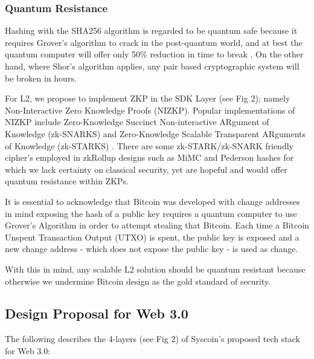 \documentclass[peerreview]{ieeesyscoin}
\begin{document}
\subsubsection{Quantum Resistance}

Hashing with the SHA256 algorithm is regarded to be quantum safe because it requires Grover's algorithm to crack in the post-quantum world, and at best the quantum computer will offer only 50\% reduction in time to break \cite{Nai19}. On the other hand, where Shor’s algorithm applies, any pair based cryptographic system will be broken in hours.

For L2, we propose to implement ZKP in the SDK Layer (see Fig 2); namely Non-Interactive Zero Knowledge Proofs (NIZKP). Popular implementations of NIZKP include Zero-Knowledge Succinct Non-interactive ARgument of Knowledge (zk-SNARKS) and Zero-Knowledge Scalable Transparent ARguments of Knowledge (zk-STARKS) \cite{Nas19}. There are some zk-STARK/zk-SNARK friendly cipher’s employed in zkRollup designs such as MiMC and Pederson hashes for which we lack certainty on classical security, yet are hopeful and would offer quantum resistance within ZKPs.

It is essential to acknowledge that Bitcoin was developed with change addresses in mind exposing the hash of a public key requires a quantum computer to use Grover’s Algorithm in order to attempt stealing that Bitcoin. Each time a Bitcoin Unspent Transaction Output (UTXO) is spent, the public key is exposed and a new change address - which does not expose the public key - is used as change.

With this in mind, any scalable L2 solution should be quantum resistant because otherwise we undermine Bitcoin design as the gold standard of security.


\subsection{Design Proposal for Web 3.0}

The following describes the 4-layers (see Fig 2) of Syscoin’s proposed tech stack for Web 3.0:
\end{document}
